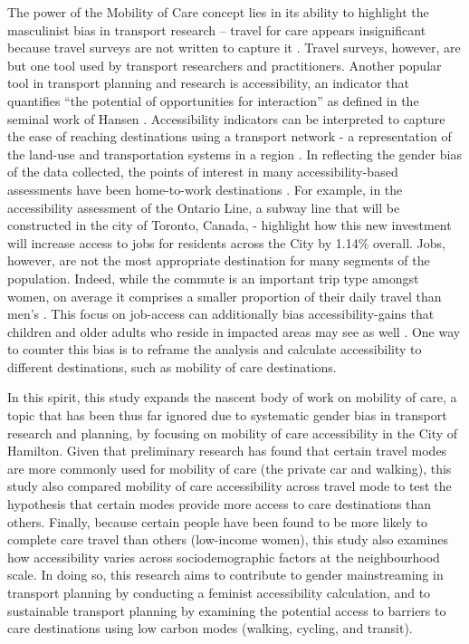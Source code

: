 \documentclass[
  super,
  preprint,
  3p]{elsarticle}
\begin{document}
The power of the Mobility of Care concept lies in its ability to
highlight the masculinist bias in transport research -- travel for care
appears insignificant because travel surveys are not written to capture
it \citep{sanchezdemadariagaMobilityCareIntroducing2013}. Travel
surveys, however, are but one tool used by transport researchers and
practitioners. Another popular tool in transport planning and research
is accessibility, an indicator that quantifies ``the potential of
opportunities for interaction'' as defined in the seminal work of Hansen
\citep{hansenHowAccessibilityShapes1959}. Accessibility indicators can
be interpreted to capture the ease of reaching destinations using a
transport network - a representation of the land-use and transportation
systems in a region
\citep{hansenHowAccessibilityShapes1959, handyAccessibilityIdeaWhose2020, elgeneidyMakingAccessibilityWork2021}.
In reflecting the gender bias of the data collected, the points of
interest in many accessibility-based assessments have been home-to-work
destinations
\citep{kelobonyeRelativeAccessibilityAnalysis2019, farberOntarioLineSocioeconomic2019}.
For example, in the accessibility assessment of the Ontario Line, a
subway line that will be constructed in the city of Toronto, Canada,
-\citet{farberOntarioLineSocioeconomic2019} highlight how this new
investment will increase access to jobs for residents across the City by
1.14\% overall. Jobs, however, are not the most appropriate destination
for many segments of the population. Indeed, while the commute is an
important trip type amongst women, on average it comprises a smaller
proportion of their daily travel than men's
\citep{ravensbergenExploratoryAnalysisMobility2022}. This focus on
job-access can additionally bias accessibility-gains that children and
older adults who reside in impacted areas may see as well
\citep{grantsmithManagingChallengesCombining2016}. One way to counter
this bias is to reframe the analysis and calculate accessibility to
different destinations, such as mobility of care destinations.

In this spirit, this study expands the nascent body of work on mobility
of care, a topic that has been thus far ignored due to systematic gender
bias in transport research and planning, by focusing on mobility of care
accessibility in the City of Hamilton. Given that preliminary research
has found that certain travel modes are more commonly used for mobility
of care (the private car and walking), this study also compared mobility
of care accessibility across travel mode to test the hypothesis that
certain modes provide more access to care destinations than others.
Finally, because certain people have been found to be more likely to
complete care travel than others (low-income women), this study also
examines how accessibility varies across sociodemographic factors at the
neighbourhood scale. In doing so, this research aims to contribute to
gender mainstreaming in transport planning by conducting a feminist
accessibility calculation, and to sustainable transport planning by
examining the potential access to barriers to care destinations using
low carbon modes (walking, cycling, and transit).
\end{document}
